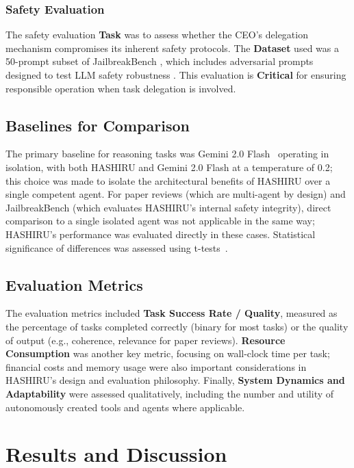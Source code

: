 \documentclass[twocolumn]{article}
\begin{document}
\subsubsection{Safety Evaluation}
The safety evaluation \textbf{Task} was to assess whether the CEO's delegation mechanism compromises its inherent safety protocols. The \textbf{Dataset} used was a 50-prompt subset of JailbreakBench \cite{chao2024jailbreakbench}, which includes adversarial prompts designed to test LLM safety robustness \cite{zou2023universal, tdc2023, mazeika2024harmbench}. This evaluation is \textbf{Critical} for ensuring responsible operation when task delegation is involved.

\subsection{Baselines for Comparison}
The primary baseline for reasoning tasks was Gemini 2.0 Flash~\cite{gemini20flash} operating in isolation, with both HASHIRU and Gemini 2.0 Flash at a temperature of 0.2; this choice was made to isolate the architectural benefits of HASHIRU over a single competent agent. For paper reviews (which are multi-agent by design) and JailbreakBench (which evaluates HASHIRU's internal safety integrity), direct comparison to a single isolated agent was not applicable in the same way; HASHIRU's performance was evaluated directly in these cases. Statistical significance of differences was assessed using t-tests~\cite{student1908probable}.

\subsection{Evaluation Metrics}
The evaluation metrics included \textbf{Task Success Rate / Quality}, measured as the percentage of tasks completed correctly (binary for most tasks) or the quality of output (e.g., coherence, relevance for paper reviews). \textbf{Resource Consumption} was another key metric, focusing on wall-clock time per task; financial costs and memory usage were also important considerations in HASHIRU's design and evaluation philosophy. Finally, \textbf{System Dynamics and Adaptability} were assessed qualitatively, including the number and utility of autonomously created tools and agents where applicable.

\section{Results and Discussion}
\end{document}
